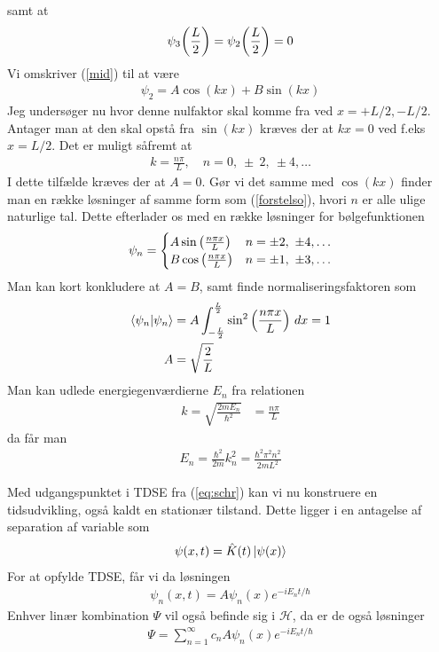 \documentclass[12pt]{article}
\theoremstyle{definition}
\theoremstyle{remark}
\theoremstyle{definition}
\numberwithin{equation}{section}
\begin{document}
samt at
\begin{align}
    \psi_3\qty(\frac{L}{2})=\psi_2\qty(\frac{L}{2})=0
\end{align}
Vi omskriver (\ref{mid}) til at være
\begin{align}
    \psi_2 = A\cos(kx)+B\sin(kx)
\end{align}
Jeg undersøger nu hvor denne nulfaktor skal komme fra ved $x=+L/2,-L/2$. Antager man at den skal opstå fra $\sin(kx)$ kræves der at $kx=0$ ved f.eks $x=L/2$. Det er muligt såfremt at 
\begin{align}
\label{forstelso}
    k=\frac{n\pi}{L},\quad n=0,~\pm~2,~\pm 4,\dots
\end{align} I dette tilfælde kræves der at $A=0$. Gør vi det samme med $\cos(kx)$ finder man en række løsninger af samme form som (\ref{forstelso}), hvori $n$ er alle ulige naturlige tal. Dette efterlader os med en række løsninger for bølgefunktionen
\begin{align}
    \psi_n = \begin{cases}
    A\sin\qty(\frac{n\pi x}{L}) & n=\pm2,~\pm 4,\dots \\
    B\cos\qty(\frac{n\pi x}{L}) & n=\pm1,~\pm 3,\dots
    \end{cases}
\end{align}
Man kan kort konkludere at $A=B$, samt finde normaliseringsfaktoren som
\begin{align}
\begin{split}
    \braket{\psi_n}{\psi_n} &= A \int_{-\frac{L}{2}}^{\frac{L}{2}} \sin^2\qty(\frac{n\pi x}{L})~dx=1 \\
    A &= \sqrt{\frac{2}{L}}
\end{split}
\end{align}
Man kan udlede energiegenværdierne $E_n$ fra relationen
\begin{align}
    k = \sqrt{\frac{2mE_n}{\hbar^2}} &= \frac{n\pi}{L}
\end{align}
da får man
\begin{align}
    E_n = \frac{\hbar^2}{2m}k^2_n = \frac{\hbar^2\pi^2n^2}{2mL^2}
\end{align}

Med udgangspunktet i TDSE fra (\ref{eq:schr}) kan vi nu konstruere en tidsudvikling, også kaldt en stationær tilstand. Dette ligger i en antagelse af separation af variable som
\begin{align}
    \psi(x,t) = \hat K(t) \ket{\psi(x)}
\end{align}
For at opfylde TDSE, får vi da løsningen
\begin{align}
    \psi_n(x,t) = A\psi_n(x)e^{-iE_nt/\hbar}
\end{align}
Enhver linær kombination $\Psi$ vil også befinde sig i $\mathcal H$, da er de også løsninger
\begin{align}
    \Psi = \sum_{n=1}^\infty c_nA\psi_n(x)e^{-iE_nt/\hbar}
\end{align}
\end{document}
